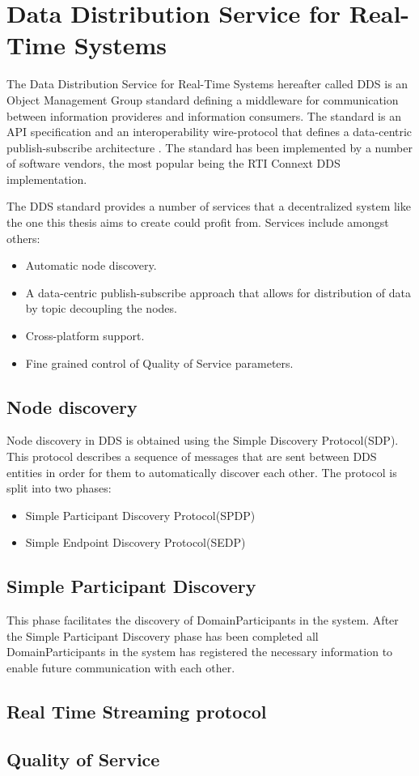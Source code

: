 \section{Data Distribution Service for Real-Time Systems}
The Data Distribution Service for Real-Time Systems hereafter called DDS is an Object Management Group standard defining a middleware for communication between information provideres and information consumers.
The standard is an API specification and an interoperability wire-protocol that defines a data-centric publish-subscribe architecture \cite{pardo2003omg}.
The standard has been implemented by a number of software vendors, the most popular being the RTI Connext DDS implementation.

The DDS standard provides a number of services that a decentralized system like the one this thesis aims to create could profit from.
Services include amongst others:

\begin{itemize}
	\item Automatic node discovery.
	\item A data-centric publish-subscribe approach that allows for distribution of data by topic decoupling the nodes.
	\item Cross-platform support.
	\item Fine grained control of Quality of Service parameters.
\end{itemize}

\subsection{Node discovery}
Node discovery in DDS is obtained using the Simple Discovery Protocol(SDP).
This protocol describes a sequence of messages that are sent between DDS entities in order for them to automatically discover each other.
The protocol is split into two phases:

\begin{itemize}
	\item Simple Participant Discovery Protocol(SPDP)
	\item Simple Endpoint Discovery Protocol(SEDP)
\end{itemize}

\subsection{Simple Participant Discovery}
This phase facilitates the discovery of DomainParticipants in the system.
After the Simple Participant Discovery phase has been completed all DomainParticipants in the system has registered the necessary information to enable future communication with each other.

\subsection{Real Time Streaming protocol}

\subsection{Quality of Service}
